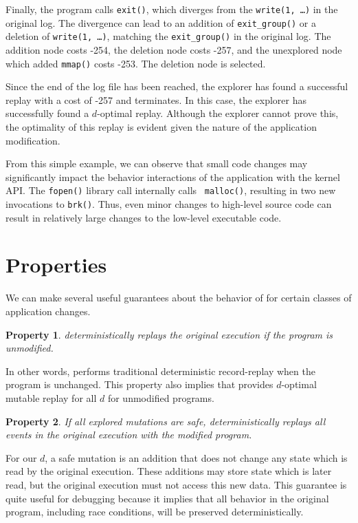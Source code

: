 Finally, the program calls {\tt exit()}, which diverges
from the {\tt write(1, \ldots)} in the original log. The
divergence can lead to an addition of {\tt exit\_group()}
or a deletion of {\tt write(1, \ldots)}, matching the
{\tt exit\_group()} in the original log.
The addition node costs -254, the deletion node costs -257, and the unexplored node
which added {\tt mmap()} costs -253. The deletion node is selected.

Since the end of the log file has been reached, the explorer has found a
successful replay with a cost of -257 and terminates. In this case, the explorer
has successfully found a $d$-optimal replay. Although the explorer cannot prove
this, the optimality of this replay is evident given the nature of the
application modification.

From this simple example, we can observe that small code
changes may significantly impact the behavior interactions of the application
with the kernel API.  The {\tt fopen()} library call internally calls {\tt
malloc()}, resulting in two new invocations to {\tt brk()}. Thus, even minor
changes to high-level source code can result in relatively large changes to the
low-level executable code.
\section{Properties}
\label{dora:sec:properties}

We can make several useful guarantees about the behavior of {\dora}
for certain classes of application changes.

\newtheorem{property}{Property}

\begin{property}
	{\dora} deterministically replays the original execution
        if the program is unmodified.
\end{property}
        In other words, {\dora} performs traditional
        deterministic record-replay when the program is unchanged.
        This property also implies that {\dora} provides
        $d$-optimal mutable replay for all $d$ for unmodified programs.

\begin{property}
	If all explored mutations are \emph{safe}, {\dora}
        deterministically replays all events in the original execution
        with the modified program. 
\end{property}
	For our $d$, a safe mutation is an addition that does not change
	any state which is read by the original execution. These additions may store
	state which is later read, but the original execution must not access this
	new data. This guarantee is quite useful for
	debugging because it implies that all behavior in the original program,
	including race conditions, will be preserved deterministically.

